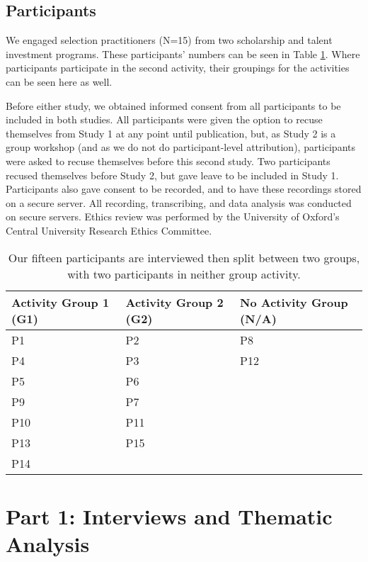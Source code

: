 \subsection{Participants}
We engaged selection practitioners (N=15) from two scholarship and talent investment programs. These participants' numbers can be seen in Table \ref{tab:participants}. Where participants participate in the second activity, their groupings for the activities can be seen here as well.

Before either study, we obtained informed consent from all participants to be included in both studies. All participants were given the option to recuse themselves from Study 1 at any point until publication, but, as Study 2 is a group workshop (and as we do not do participant-level attribution), participants were asked to recuse themselves before this second study. Two participants recused themselves before Study 2, but gave leave to be included in Study 1. Participants also gave consent to be recorded, and to have these recordings stored on a secure server. All recording, transcribing, and data analysis was conducted on secure servers. Ethics review was performed by the University of Oxford's Central University Research Ethics Committee.

\begin{center}
\begin{table}[htbp]
    \centering
    \caption{Our fifteen participants are interviewed then split between two groups, with two participants in neither group activity.}
    \label{tab:participants}
    \begin{tabular}{l l l}
        \toprule
        Activity Group 1 (G1) & Activity Group 2 (G2) & No Activity Group (N/A)\\
        \midrule
        P1 & P2 & P8 \\
        P4 & P3 & P12 \\
        P5 & P6 & \\
        P9 & P7 & \\
        P10 & P11 & \\
        P13 & P15 & \\
        P14 & & \\
        \bottomrule
    \end{tabular}
\end{table}
\end{center}

\section{Part 1: Interviews and Thematic Analysis}\label{sec:study1}
